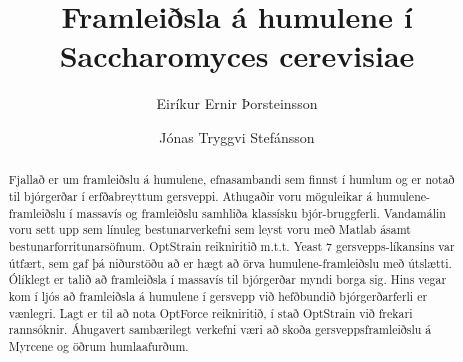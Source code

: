 \documentclass[11pt]{article}
\title{Framleiðsla á humulene í Saccharomyces cerevisiae}
\author{Eiríkur Ernir Þorsteinsson \and Jónas Tryggvi Stefánsson}
\date{}
\begin{document}
\maketitle

\setlength{\columnsep}{1cm}

\begin{abstract}
Fjallað er um framleiðslu á humulene, efnasambandi sem finnst í humlum og er notað til bjórgerðar í erfðabreyttum gersveppi. 
Athugaðir voru möguleikar á humulene-framleiðslu í massavís og framleiðslu samhliða klassísku bjór-bruggferli. 
Vandamálin voru sett upp sem línuleg bestunarverkefni sem leyst voru með Matlab ásamt bestunarforritunarsöfnum.
OptStrain reikniritið m.t.t. Yeast 7 gersvepps-líkansins var útfært, sem gaf þá niðurstöðu að er hægt að örva humulene-framleiðslu með útslætti. Ólíklegt er talið að framleiðsla í massavís til bjórgerðar myndi borga sig.  Hins vegar kom í ljós að framleiðsla á humulene í gersvepp við hefðbundið bjórgerðarferli er vænlegri.
Lagt er til að nota OptForce reikniritið, í stað OptStrain við frekari rannsóknir. Áhugavert sambærilegt verkefni væri að skoða gersveppsframleiðslu á Myrcene og öðrum humlaafurðum.
\end{abstract}
\end{document}
